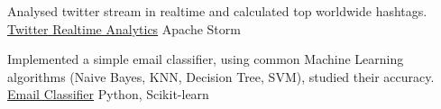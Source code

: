 \begin{cventries}
  \cventry
    {Analysed twitter stream in realtime and calculated top worldwide
hashtags.} %
    {\href{https://github.com/rajdeepbharati/Twitter-Realtime-Analytics}{Twitter Realtime Analytics}} %
    {Apache Storm} %
    {} %
    {
      \begin{cvitems} %
      \end{cvitems}
    }

  \cventry
    {Implemented a simple email classifier, using common Machine Learning algorithms (Naive Bayes, KNN, Decision Tree, SVM), studied their accuracy.} %
    {\href{https://github.com/rajdeepbharati/Email-Classifier}{Email Classifier}} %
    {Python, Scikit-learn} %
    {} %
    {
      \begin{cvitems} %
      \end{cvitems}
    }
\begin{comment}

  \cventry
    {A collection of python scripts to automate Facebook.} %
    {\href{https://github.com/rajdeepbharati/FB-Automation}{FB Automation}} %
    {Python, Selenium} %
    {} %
    {
      \begin{cvitems} %
      \end{cvitems}
    }

  \cventry
    {A collection of python scripts to automate Facebook.} %
    {\href{https://github.com/rajdeepbharati/FB-Automation}{FB Automation}} %
    {Python, Selenium} %
    {} %
    {
      \begin{cvitems} %
      \end{cvitems}
    }


\end{comment}
\end{cventries}
